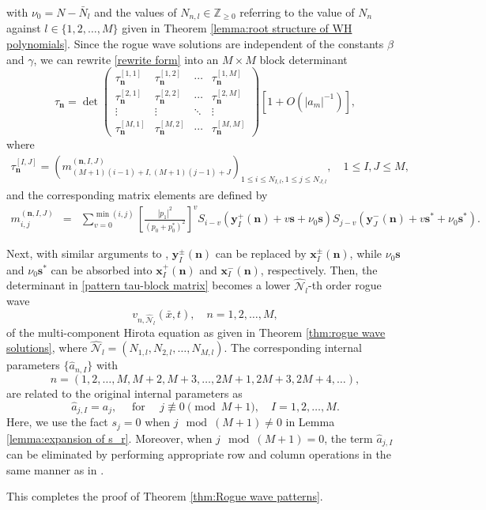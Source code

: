 \documentclass[preprint,3p,10pt]{elsarticle}
\newcommand{\Z}{\mathbb Z}
\theoremstyle{definition}
\begin{document}
with $\nu_0=N-\bar{N}_l$ and the values of $N_{n,l}\in \Z_{\ge0}$ referring to the value of $N_n$ against $l\in\{1,2,\ldots,M\}$ given in Theorem \ref{lemma:root structure of WH polynomials}.
Since the rogue wave solutions are independent of the constants $\beta$ and $\gamma$, we can rewrite \eqref{rewrite form} into an $M \times M$ block determinant
\begin{equation} \label{pattern tau-block matrix}
\tau_{\mathbf{n}}=\det\left(\begin{array}{llll}
\tau_{\mathbf{n}}^{[1,1]} & \tau_{\mathbf{n}}^{[1,2]}&\cdots&\tau_{\mathbf{n}}^{[1,M]} \\
\tau_{\mathbf{n}}^{[2,1]} & \tau_{\mathbf{n}}^{[2,2]}&\cdots&\tau_{\mathbf{n}}^{[2,M]} \\ \vdots & \vdots& \ddots &\vdots \\\tau_{\mathbf{n}}^{[M,1]} & \tau_{\mathbf{n}}^{[M,2]}&\cdots&\tau_{\mathbf{n}}^{[M,M]}
\end{array}\right)\left[1+O\left(|a_m|^{-1}\right)\right],
\end{equation}
where 
\begin{eqnarray}
\tau_{\mathbf{n}}^{[I, J]}=\left(m_{(M+1)(i-1)+I,(M+1)(j-1)+J}^{(\mathbf{n},I, J)}\right)_{1 \leq i \leq N_{I,l}, 1 \leq j \leq N_{J,l}}, \quad 1 \leq I, J \leq M,
\end{eqnarray}
and the corresponding matrix elements are defined by
\begin{eqnarray}
m_{i, j}^{(\mathbf{n},I, J)}&=&\sum_{v=0}^{\min (i, j)}\left[\frac{\left|p_{1}\right|^{2}}{\left(p_{0}+p_{0}^{*}\right)^{2}}\right]^{v} S_{i-v}\left(\mathbf{y}_I^{+}(\mathbf{n})+v \mathbf{s} + \nu_0 \mathbf{s}\right) S_{j-v}\left(\mathbf{y}_J^{-}(\mathbf{n})+v \mathbf{s}^{*} + \nu_0 \mathbf{s}^{*}\right).
\end{eqnarray}

Next, with similar arguments to \cite{yang2023rogue,zhang2022rogue}, $\mathbf{y}_I^{\pm}(\mathbf{n})$ can be replaced by $\mathbf{x}_I^{\pm}(\mathbf{n})$, while $\nu_0 \mathbf{s}$ and $\nu_0 \mathbf{s}^{*}$ can be absorbed into $\mathbf{x}_I^{+}(\mathbf{n})$ and $\mathbf{x}_I^{-}(\mathbf{n})$, respectively. Then, the determinant in \eqref{pattern tau-block matrix} becomes a lower $\widehat{\mathcal{N}}_l$-th order rogue wave 
$$
v_{n, \widehat{\mathcal{N}}_l}(\bar{x}, t), \quad n=1,2,\dots,M,
$$
of the multi-component Hirota equation as given in Theorem \ref{thm:rogue wave solutions}, where $\widehat{\mathcal{N}}_l=(N_{1,l},N_{2,l},\dots,N_{M,l})$. The corresponding internal parameters $\{\hat{a}_{n,I}\}$ with 
$$n=(1,2,\dots,M,M+2,M+3,\dots,2M+1,2M+3,2M+4,\dots), $$ are related to the original internal parameters as
\begin{equation}
     \hat{a}_{j,I} = a_j, \quad\text{ for }\quad j \not \equiv 0  \pmod{M+1}, \quad I=1,2,\dots,M.
\end{equation}
Here, we use the fact $s_j=0$ when $j \mod (M+1) \not =0$ in Lemma \ref{lemma:expansion of s_r}. Moreover, when $j \mod (M+1) =0$, the term $\hat{a}_{j,I}$ can be eliminated by performing appropriate row and column operations in the same manner as in \cite{yang2023rogue}.

This completes the proof of Theorem \ref{thm:Rogue wave patterns}.





\end{document}
